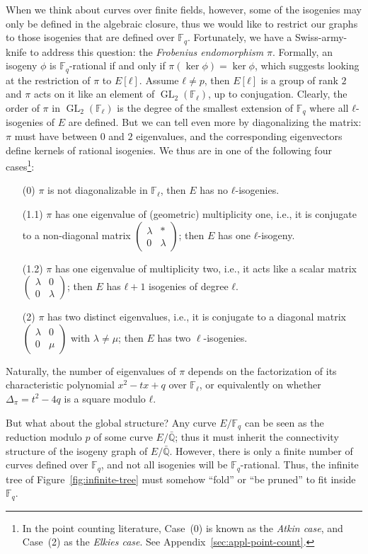 \documentclass[10pt]{article}
\theoremstyle{plain}
\theoremstyle{definition}
\DeclareMathOperator{\GL}{GL}
\def\F{\ensuremath{\mathbb{F}}}
\def\mat#1{\left(\begin{smallmatrix}#1\end{smallmatrix}\right)}
\begin{document}
\begin{prposition}
When we think about curves over finite fields, however, some of the
isogenies may only be defined in the algebraic closure, thus we would
like to restrict our graphs to those isogenies that are defined over
$\F_q$. %
Fortunately, we have a Swiss-army-knife to address this question: the
\emph{Frobenius endomorphism} $π$. %
Formally, an isogeny $ϕ$ is $\F_q$-rational if and only if
$π(\ker ϕ)=\ker ϕ$, which suggests looking at the restriction of $π$
to $E[ℓ]$. %
Assume $ℓ≠p$, then $E[ℓ]$ is a group of rank $2$ and $π$ acts on it
like an element of $\GL_2(\F_ℓ)$, up to conjugation. %
Clearly, the order of $π$ in $\GL_2(\F_ℓ)$ is the degree of the
smallest extension of $\F_q$ where all $ℓ$-isogenies of $E$ are
defined. %
But we can tell even more by diagonalizing the matrix: $π$ must have
between $0$ and $2$ eigenvalues, and the corresponding eigenvectors
define kernels of rational isogenies. %
We thus are in one of the following four cases\footnote{In the point
  counting literature, Case~(0) is known as the \emph{Atkin case}, and
  Case~(2) as the \emph{Elkies case}. See
  Appendix~\ref{sec:appl-point-count}.}:
\begin{itemize}
\item[(0)] $π$ is not diagonalizable in $\F_ℓ$, then $E$ has no
  $ℓ$-isogenies.
\item[(1.1)] $π$ has one eigenvalue of (geometric) multiplicity one,
  i.e., it is conjugate to a non-diagonal matrix
  $\mat{λ&*\\0&λ}$; then
  $E$ has one $ℓ$-isogeny.
\item[(1.2)] $π$ has one eigenvalue of multiplicity two, i.e., it acts
  like a scalar matrix
  $\mat{λ&0\\0&λ}$; then
  $E$ has $ℓ+1$ isogenies of degree $ℓ$.
\item[(2)] $π$ has two distinct eigenvalues, i.e., it is conjugate to
  a diagonal matrix
  $\mat{λ&0\\0&μ}$ with
  $\lambda\neq\mu$; then $E$ has two $\ell$-isogenies.
\end{itemize}

Naturally, the number of eigenvalues of $π$ depends on the
factorization of its characteristic polynomial $x^2-tx+q$ over $\F_ℓ$,
or equivalently on whether $Δ_π=t^2-4q$ is a square modulo $ℓ$. %

But what about the global structure? %
Any curve $E/\F_q$ can be seen as the reduction modulo $p$ of some
curve $E/\bar{ℚ}$; thus it must inherit the connectivity structure of
the isogeny graph of $E/\bar{ℚ}$. %
However, there is only a finite number of curves defined over $\F_q$,
and not all isogenies will be $\F_q$-rational. %
Thus, the infinite tree of Figure~\ref{fig:infinite-tree} must somehow
``fold'' or ``be pruned'' to fit inside $\F_q$. %


\end{prposition}
\end{document}
